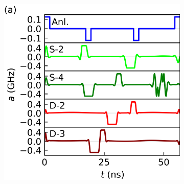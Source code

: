 \documentclass[
  amsfonts,
  amsmath,
  tbtags,
  amssymb,
  aps,
  nobibnotes,
  twocolumn,
]{revtex4-2}
\begin{document}
\begin{figure}[ht]
  \begin{subfigure}{.6\linewidth}
    \includegraphics[width=\linewidth]{assets/f2a.png}
  \end{subfigure}%
  \begin{subfigure}{.4\linewidth}

\end{subfigure}
\end{figure}
\end{document}
